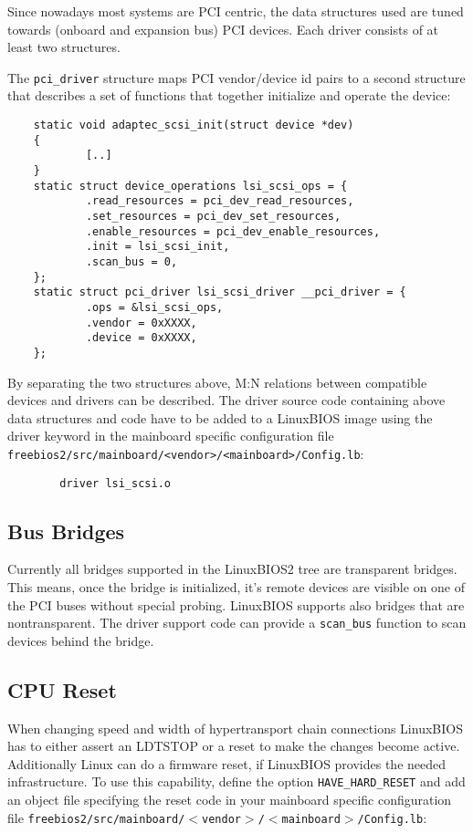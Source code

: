 \documentclass[titlepage,12pt]{article}
\begin{document}
Since nowadays most systems are PCI centric, the data structures used
are tuned towards (onboard and expansion bus) PCI devices. Each driver
consists of at least two structures.

The \texttt{pci\_driver} structure maps PCI vendor/device id pairs to a
second structure that describes a set of functions that together
initialize and operate the device:

\begin{verbatim}
    static void adaptec_scsi_init(struct device *dev)
    {
            [..]
    }
    static struct device_operations lsi_scsi_ops = {
            .read_resources = pci_dev_read_resources,
            .set_resources = pci_dev_set_resources,
            .enable_resources = pci_dev_enable_resources,
            .init = lsi_scsi_init,
            .scan_bus = 0,
    };
    static struct pci_driver lsi_scsi_driver __pci_driver = {
            .ops = &lsi_scsi_ops,
            .vendor = 0xXXXX,
            .device = 0xXXXX,
    };
\end{verbatim}

By separating the two structures above, M:N relations between compatible
devices and drivers can be described. The driver source code containing
above data structures and code have to be added to a LinuxBIOS image
using the driver keyword in the mainboard specific configuration file \\
\texttt{freebios2/src/mainboard/<vendor>/<mainboard>/Config.lb}:

\begin{verbatim}
        driver lsi_scsi.o
\end{verbatim}

\subsection{Bus Bridges}

Currently all bridges supported in the LinuxBIOS2 tree are transparent
bridges. This means, once the bridge is initialized, it's remote devices
are visible on one of the PCI buses without special probing. LinuxBIOS
supports also bridges that are nontransparent.  The driver support code
can provide a \texttt{scan\_bus} function to scan devices behind the bridge.

\subsection{CPU Reset}
When changing speed and width of hypertransport chain connections
LinuxBIOS has to either assert an LDTSTOP or a reset to make the changes
become active.  Additionally Linux can do a firmware reset, if LinuxBIOS
provides the needed infrastructure. To use this capability, define the
option \texttt{HAVE\_HARD\_RESET} and add an object file specifying the
reset code in your mainboard specific configuration file
\texttt{freebios2/src/mainboard/$<$vendor$>$/$<$mainboard$>$/Config.lb}:
\end{document}
